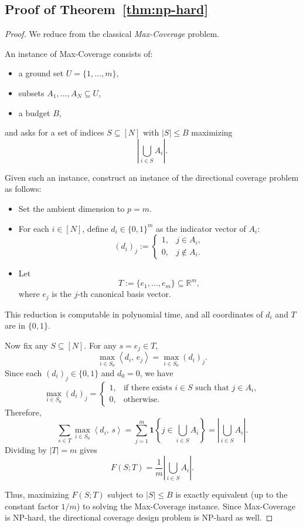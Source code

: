 \documentclass[accepted]{uai2026}
\theoremstyle{plain}
\theoremstyle{definition}
\theoremstyle{remark}
\newcommand{\R}{\mathbb{R}}
\newcommand{\ip}[2]{\left\langle #1 ,\, #2 \right\rangle}
\begin{document}

\subsection{Proof of Theorem~\ref{thm:np-hard}}
\label{app:theom4_3}

\begin{proof}
We reduce from the classical \emph{Max-Coverage} problem.

An instance of Max-Coverage consists of:
\begin{itemize}
    \item a ground set $U=\{1,\dots,m\}$,
    \item subsets $A_1,\dots,A_N\subseteq U$,
    \item a budget $B$,
\end{itemize}
and asks for a set of indices $S\subseteq[N]$ with $|S|\le B$ maximizing
\[
\left|\bigcup_{i\in S}A_i\right|.
\]

Given such an instance, construct an instance of the directional coverage problem as follows:
\begin{itemize}
    \item Set the ambient dimension to $p=m$.
    \item For each $i\in[N]$, define $d_i\in\{0,1\}^m$ as the indicator vector of $A_i$:
    \[
    (d_i)_j :=
    \begin{cases}
    1, & j\in A_i,\\
    0, & j\notin A_i.
    \end{cases}
    \]
    \item Let
    \[
    T:=\{e_1,\dots,e_m\}\subseteq\R^m,
    \]
    where $e_j$ is the $j$-th canonical basis vector.
\end{itemize}
This reduction is computable in polynomial time, and all coordinates of $d_i$ and $T$ are in $\{0,1\}$.

Now fix any $S\subseteq[N]$. For any $s=e_j\in T$,
\[
\max_{i\in S_0}\ip{d_i}{e_j}
=
\max_{i\in S_0}(d_i)_j.
\]
Since each $(d_i)_j\in\{0,1\}$ and $d_0=0$, we have
\[
\max_{i\in S_0}(d_i)_j =
\begin{cases}
1, & \text{if there exists }i\in S\text{ such that }j\in A_i,\\
0, & \text{otherwise}.
\end{cases}
\]
Therefore,
\[
\sum_{s\in T}\max_{i\in S_0}\ip{d_i}{s}
=
\sum_{j=1}^m \mathbf{1}\!\left\{j\in \bigcup_{i\in S}A_i\right\}
=
\left|\bigcup_{i\in S}A_i\right|.
\]
Dividing by $|T|=m$ gives
\[
F(S;T)=\frac1m\left|\bigcup_{i\in S}A_i\right|.
\]

Thus, maximizing $F(S;T)$ subject to $|S|\le B$ is exactly equivalent (up to the constant factor $1/m$) to solving the Max-Coverage instance. Since Max-Coverage is NP-hard, the directional coverage design problem is NP-hard as well.
\end{proof}
\end{document}
